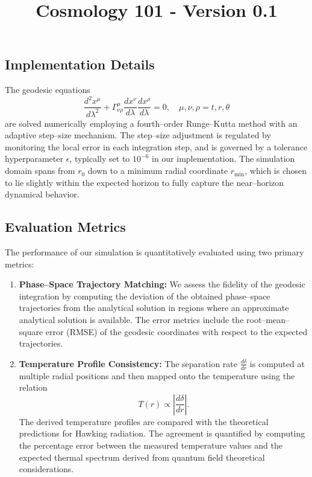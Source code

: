\documentclass{article}\usepackage{graphicx} \usepackage{amsmath} \usepackage{colortbl}\title{Cosmology 101 - Version 0.1}
\begin{document}
\subsection{Implementation Details}
The geodesic equations
\begin{equation}
\frac{d^{2}x^{\mu}}{d\lambda^{2}}+\Gamma^{\mu}_{\nu\rho}\frac{dx^{\nu}}{d\lambda}\frac{dx^{\rho}}{d\lambda}=0, \quad \mu,\nu,\rho=t, r, \theta 
\end{equation}
are solved numerically employing a fourth--order Runge--Kutta method with an adaptive step--size mechanism. The step--size adjustment is regulated by monitoring the local error in each integration step, and is governed by a tolerance hyperparameter $\epsilon$, typically set to $10^{-6}$ in our implementation. The simulation domain spans from $r_{0}$ down to a minimum radial coordinate $r_{\mathrm{min}}$, which is chosen to lie slightly within the expected horizon to fully capture the near--horizon dynamical behavior.

\subsection{Evaluation Metrics}
The performance of our simulation is quantitatively evaluated using two primary metrics:
\begin{enumerate}
    \item \textbf{Phase--Space Trajectory Matching:} We assess the fidelity of the geodesic integration by computing the deviation of the obtained phase--space trajectories from the analytical solution in regions where an approximate analytical solution is available. The error metrics include the root--mean--square error (RMSE) of the geodesic coordinates with respect to the expected trajectories.
    \item \textbf{Temperature Profile Consistency:} The separation rate $\frac{d\delta}{dr}$ is computed at multiple radial positions and then mapped onto the temperature using the relation
    \begin{equation}
    T(r) \propto \left| \frac{d\delta}{dr}\right|. 
    \end{equation}
    The derived temperature profiles are compared with the theoretical predictions for Hawking radiation. The agreement is quantified by computing the percentage error between the measured temperature values and the expected thermal spectrum derived from quantum field theoretical considerations.
\end{enumerate}
\end{document}
